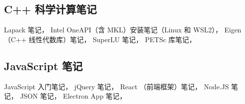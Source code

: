 \subsection{C++ 科学计算笔记}
Lapack 笔记，
Intel OneAPI（含 MKL）安装笔记（Linux 和 WSL2），
Eigen （C++ 线性代数库）笔记，
SuperLU 笔记，
PETSc 库笔记，

\subsection{JavaScript 笔记}
JavaScript 入门笔记，
jQuery 笔记，
React （前端框架）笔记，
Node.JS 笔记，
JSON 笔记，
Electron App 笔记，
